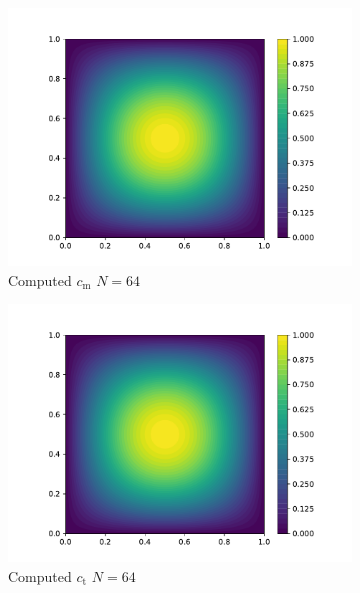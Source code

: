 \begin{figure}
    \centering
    \begin{subfigure}{0.3\linewidth}
        \centering
        \includegraphics[width=\linewidth]{Figures/Chapter2/c_m.pdf}
        \caption{Computed $c_\mathrm{m}$ $N=64$}
    \end{subfigure}%
    \begin{subfigure}{0.3\linewidth}
        \centering
        \includegraphics[width=\linewidth]{Figures/Chapter2/c_t.pdf}
        \caption{Computed $c_\mathrm{t}$ $N=64$}
    \end{subfigure}%
    \begin{subfigure}{0.3\linewidth}
        \centering

\end{subfigure}
\end{figure}
